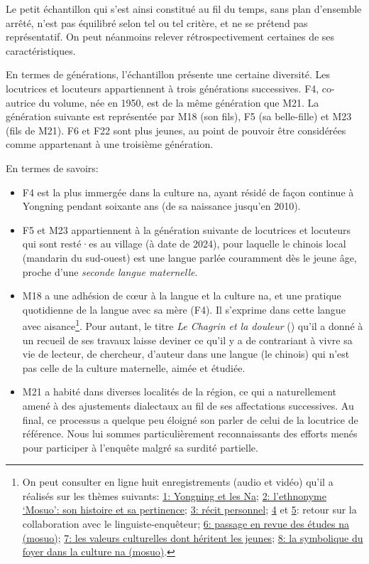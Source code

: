 Le petit échantillon qui s'est ainsi constitué au fil du temps, sans plan d'ensemble arrêté, n'est pas équilibré selon tel ou tel critère, et ne se prétend pas représentatif. On peut néanmoins relever rétrospectivement certaines de ses caractéristiques.

En termes de générations, l'échantillon présente une certaine diversité. Les locutrices et locuteurs appartiennent à trois générations successives. F4, co-autrice du volume, née en 1950, est de la même génération que M21. La génération suivante est représentée par M18 (son fils), F5 (sa belle-fille) et M23 (fils de M21). F6 et F22 sont plus jeunes, au point de pouvoir être considérées comme appartenant à une troisième génération.

En termes de savoirs:

\begin{itemize}
    \item F4 est la plus immergée dans la culture na, ayant résidé de façon continue à Yongning pendant soixante ans (de sa naissance jusqu'en 2010).
    \item F5 et M23 appartiennent à la génération suivante de locutrices et locuteurs qui sont resté·es au village (à date de 2024), pour laquelle le chinois local (mandarin du sud-ouest) est une langue parlée couramment dès le jeune âge, proche d'une \emph{seconde langue maternelle}.
    \item M18 a une adhésion de cœur à la langue et la culture na, et une pratique quotidienne de la langue avec sa mère (F4). Il s'exprime dans cette langue avec aisance\footnote{On peut consulter en ligne huit enregistrements (audio et vidéo) qu'il a réalisés sur les thèmes suivants:
    \href{https://doi.org/10.24397/pangloss-0007734}{1: Yongning et les Na}; \href{https://doi.org/10.24397/pangloss-0007740}{2: l'ethnonyme ‘Mosuo’: son histoire et sa pertinence}; \href{https://doi.org/10.24397/pangloss-0007730}{3: récit personnel}; \href{https://doi.org/10.24397/pangloss-0007736}{4} et \href{https://doi.org/10.24397/pangloss-0007738}{5}: retour sur la collaboration avec le linguiste-enquêteur; \href{https://doi.org/10.24397/pangloss-0007742}{6: passage en revue des études na (mosuo)}; \href{https://doi.org/10.24397/pangloss-0007728}{7: les valeurs culturelles dont héritent les jeunes}; \href{https://doi.org/10.24397/pangloss-0007732}{8: la symbolique du foyer dans la culture na (mosuo)}.}.
    Pour autant, le titre \emph{Le Chagrin et la douleur} () qu'il a donné à un recueil de ses travaux \parencite{latami2016} laisse deviner ce qu'il y a de contrariant à vivre sa vie de lecteur, de chercheur, d'auteur dans une langue (le chinois) qui n'est pas celle de la culture maternelle, aimée et étudiée.
    \item M21 a habité dans diverses localités de la région, ce qui a naturellement amené à des ajustements dialectaux au fil de ses affectations successives. Au final, ce processus a quelque peu éloigné son parler de celui de la locutrice de référence. Nous lui sommes particulièrement reconnaissants des efforts menés pour participer à l'enquête malgré sa surdité partielle.
\end{itemize}
